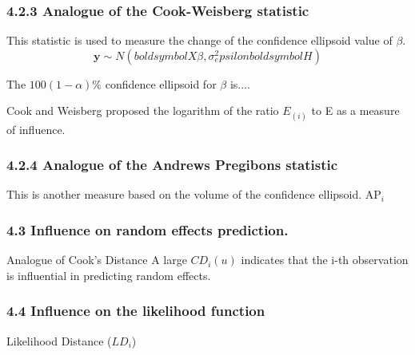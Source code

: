 \documentclass[12pt, a4paper]{article}
\begin{document}
\subsubsection*{4.2.3 Analogue of the Cook-Weisberg statistic}

This statistic is used to measure the change of the confidence ellipsoid value of $\beta$.
\[ \boldsymbol{y} \sim N ( boldsymbol{X}\beta , \sigma^2_epsilon boldsymbol{H})\]

The $100(1-\alpha)\%$ confidence ellipsoid for $\beta$ is....

Cook and Weisberg proposed the logarithm of the ratio $E_{(i)}$ to E as a measure of influence.




\subsubsection*{4.2.4 Analogue of the Andrews Pregibons statistic}
This is another measure based on the volume of the confidence ellipsoid. AP$_i$

\subsubsection*{4.3 Influence on random effects prediction.}
Analogue of Cook’s Distance
A large $CD_i(u)$ indicates that the i-th observation is influential in predicting random effects.

\subsubsection*{4.4 Influence on the likelihood function}
Likelihood Distance ($LD_i$)
\end{document}
